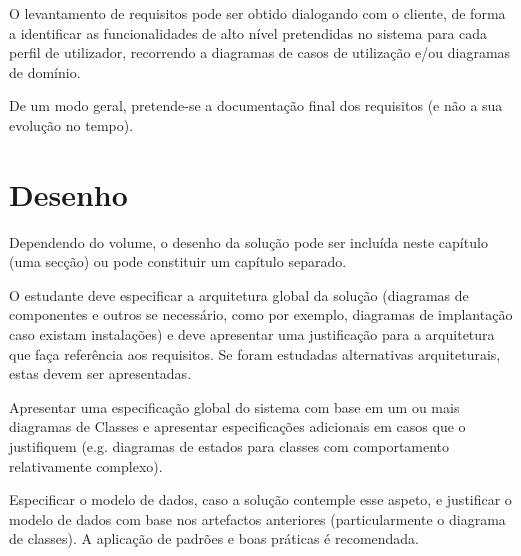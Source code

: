 O levantamento de requisitos pode ser obtido dialogando com o cliente, de forma a identificar as funcionalidades de alto nível pretendidas no sistema para cada perfil de utilizador, recorrendo a diagramas de casos de utilização e/ou diagramas de domínio. 

De um modo geral, pretende-se a documentação final dos requisitos (e não a sua evolução no tempo).

\section{Desenho} 
\label{sec:Des} 
Dependendo do volume, o desenho da solução pode ser incluída neste capítulo (uma secção) ou pode constituir um capítulo separado.

O estudante deve especificar a arquitetura global da solução (diagramas de componentes e outros se necessário, como por exemplo, diagramas de implantação caso existam instalações) e deve apresentar uma justificação para a arquitetura que faça referência aos requisitos. 
Se foram estudadas alternativas arquiteturais, estas devem ser apresentadas.

Apresentar uma especificação global do sistema com base em um ou mais diagramas de Classes e apresentar especificações adicionais em casos que o justifiquem (e.g. diagramas de estados para classes com comportamento relativamente complexo).

Especificar o modelo de dados, caso a solução contemple esse aspeto, e justificar o modelo de dados com base nos artefactos anteriores (particularmente o diagrama de classes).
A aplicação de padrões e boas práticas é recomendada.


